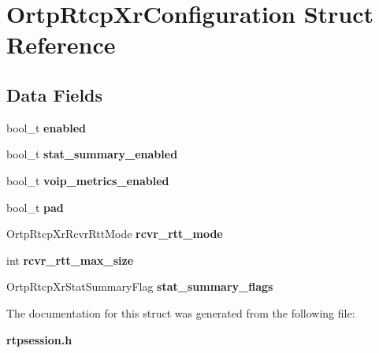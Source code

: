 \section{Ortp\+Rtcp\+Xr\+Configuration Struct Reference}
\label{structOrtpRtcpXrConfiguration}
\subsection*{Data Fields}
\begin{DoxyCompactItemize}
\item 
\mbox{\label{structOrtpRtcpXrConfiguration_a94dae53ed6a5bd3149c583619bca0778}} 
bool\+\_\+t {\bfseries enabled}
\item 
\mbox{\label{structOrtpRtcpXrConfiguration_ada4c50e95ee05a5e2c5ff9149da6575a}} 
bool\+\_\+t {\bfseries stat\+\_\+summary\+\_\+enabled}
\item 
\mbox{\label{structOrtpRtcpXrConfiguration_a6737c9a6d2368e9add2150b54cfa5c39}} 
bool\+\_\+t {\bfseries voip\+\_\+metrics\+\_\+enabled}
\item 
\mbox{\label{structOrtpRtcpXrConfiguration_aee236bdd926b519a4511a723a998ce28}} 
bool\+\_\+t {\bfseries pad}
\item 
\mbox{\label{structOrtpRtcpXrConfiguration_a29013ad80a2acd13cb83dbf63a776eed}} 
Ortp\+Rtcp\+Xr\+Rcvr\+Rtt\+Mode {\bfseries rcvr\+\_\+rtt\+\_\+mode}
\item 
\mbox{\label{structOrtpRtcpXrConfiguration_aa941337481959500f933b6dbee95e25b}} 
int {\bfseries rcvr\+\_\+rtt\+\_\+max\+\_\+size}
\item 
\mbox{\label{structOrtpRtcpXrConfiguration_a4014a5c99a42b61a13ef43aa58f3c729}} 
Ortp\+Rtcp\+Xr\+Stat\+Summary\+Flag {\bfseries stat\+\_\+summary\+\_\+flags}
\end{DoxyCompactItemize}


The documentation for this struct was generated from the following file\+:\begin{DoxyCompactItemize}
\item 
\textbf{ rtpsession.\+h}\end{DoxyCompactItemize}
